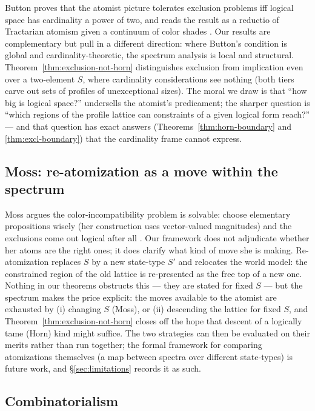 \documentclass[10pt, letterpaper]{article}
\theoremstyle{remark}
\begin{document}
Button proves that the atomist picture tolerates exclusion problems iff
logical space has cardinality a power of two, and reads the result as a
reductio of Tractarian atomism given a continuum of color shades
\cite{button2017}. Our results are complementary but pull in a different
direction: where Button's condition is global and cardinality-theoretic, the
spectrum analysis is local and structural. Theorem~\ref{thm:exclusion-not-horn}
distinguishes exclusion from implication even over a two-element $S$, where
cardinality considerations see nothing (both tiers carve out sets of profiles
of unexceptional sizes). The moral we draw is that ``how big is logical
space?'' undersells the atomist's predicament; the sharper question is
``which regions of the profile lattice can constraints of a given logical
form reach?'' --- and that question has exact answers
(Theorems~\ref{thm:horn-boundary} and \ref{thm:excl-boundary}) that the
cardinality frame cannot express.

\subsection{Moss: re-atomization as a move within the spectrum}

Moss argues the color-incompatibility problem is solvable: choose elementary
propositions wisely (her construction uses vector-valued magnitudes) and the
exclusions come out logical after all \cite{moss2012}. Our framework does not
adjudicate whether her atoms are the right ones; it does clarify what kind of
move she is making. Re-atomization replaces $S$ by a new state-type $S'$ and
relocates the world model: the constrained region of the old lattice is
re-presented as the free top of a new one. Nothing in our theorems obstructs
this --- they are stated for fixed $S$ --- but the spectrum makes the price
explicit: the moves available to the atomist are exhausted by (i) changing
$S$ (Moss), or (ii) descending the lattice for fixed $S$, and
Theorem~\ref{thm:exclusion-not-horn} closes off the hope that descent of a
logically tame (Horn) kind might suffice. The two strategies can then be
evaluated on their merits rather than run together; the formal framework for
comparing atomizations themselves (a map between spectra over different
state-types) is future work, and \S\ref{sec:limitations} records it as such.

\subsection{Combinatorialism}
\end{document}
